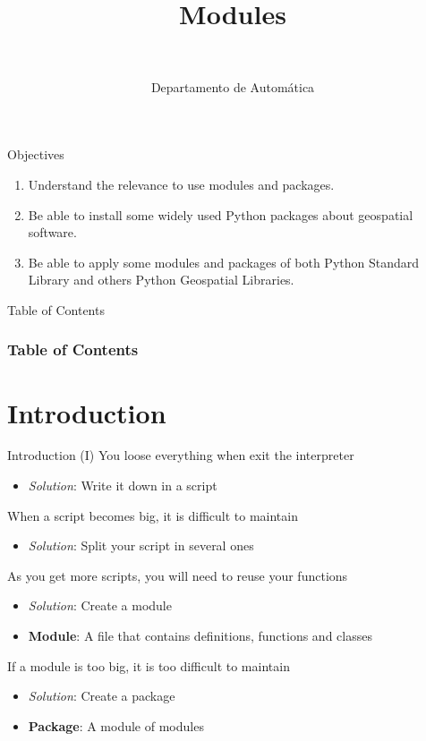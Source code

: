 \documentclass[10pt,compress]{beamer} %
\title[Modules]{Modules}
\author{\asignatura\\\carrera}
\institute{}
\date{Departamento de Automática}
\begin{document}
{\titlepageBlue
    \begin{frame}
        \titlepage
    \end{frame}
}

\begin{frame}[plain]{}
	\begin{block}{Objectives}
		\begin{enumerate}
		\item Understand the relevance to use modules and packages.
		\item Be able to install some widely used Python packages about  geospatial software.
		\item Be able to apply some modules and packages of both Python Standard Library and others Python Geospatial Libraries.
		\end{enumerate}
	\end{block}
\end{frame}

{
\begin{frame}[shrink]{Table of Contents}
 \frametitle{Table of Contents}
 \tableofcontents
\end{frame}
}

\section{Introduction}
\begin{frame}{Introduction (I)}
		You loose everything when exit the interpreter
			\begin{itemize}
			\item \textit{Solution}: Write it down in a script
			\end{itemize}
		When a script becomes big, it is difficult to maintain
			\begin{itemize}
			\item \textit{Solution}: Split your script in several ones
			\end{itemize}
		As you get more scripts, you will need to reuse your functions
			\begin{itemize}
			\item \textit{Solution}: Create a \alert{module}
			\item \textbf{Module}: A file that contains definitions, functions and classes
			\end{itemize}
		If a module is too big, it is too difficult to maintain
			\begin{itemize}
			\item \textit{Solution}: Create a \alert{package}
			\item \textbf{Package}: A module of modules
			\end{itemize}
\end{frame}
\end{document}
